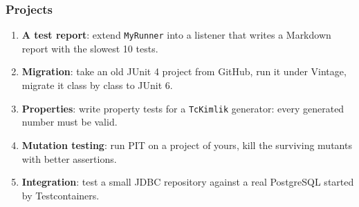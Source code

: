\documentclass[aspectratio=169,10pt,compress]{beamer}
\begin{document}
\begin{frame}[t,fragile] \frametitle{Projects}
  \begin{enumerate}\small
    \item \textbf{A test report}: extend \texttt{MyRunner} into a listener that writes a Markdown report with the slowest 10 tests.
    \item \textbf{Migration}: take an old JUnit 4 project from GitHub, run it under Vintage, migrate it class by class to JUnit 6.
    \item \textbf{Properties}: write property tests for a \texttt{TcKimlik} generator: every generated number must be valid.
    \item \textbf{Mutation testing}: run PIT on a project of yours, kill the surviving mutants with better assertions.
    \item \textbf{Integration}: test a small JDBC repository against a real PostgreSQL started by Testcontainers.
  \end{enumerate}
\end{frame}




\begin{frame}[t,fragile]
	\begin{center}
		\vspace{4cm}
	\end{center}
\end{frame}
\end{document}
